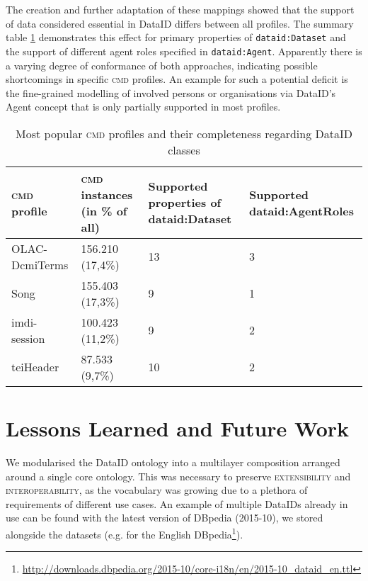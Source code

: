 \documentclass[runningheads,a4paper]{llncs}
\newcommand{\extensibility}{{\scshape extensibility}\xspace}
\newcommand{\interoperability}{{\scshape interoperability}\xspace}
\newcommand{\cmd}{{\scshape cmd}\xspace}
\newcommand{\prop}[1]{{{\texttt{#1}}}}
\newcommand\footnoteurl[1]{\footnote{\scriptsize\url{#1}}}
\begin{document}
The creation and further adaptation of these mappings showed that the support of data considered essential in DataID differs between all profiles. The summary table \ref{tab:cmdi_profiles} demonstrates this effect for primary properties of \prop{dataid:Dataset} and the support of different agent roles specified in \prop{dataid:Agent}. Apparently there is a varying degree of conformance of both approaches, indicating possible shortcomings in specific \cmd profiles. An example for such a potential deficit is the fine-grained modelling of involved persons or organisations via DataID's Agent concept that is only partially supported in most profiles.

\begin{table}[t]
    \centering
    \begin{tabular}{l|p{3cm}|p{3cm}|p{3cm}}
        \hline
        \cmd profile & \cmd instances (in \% of all) & Supported properties of dataid:Dataset & Supported dataid:AgentRoles \\
        \hline
        OLAC-DcmiTerms & 156.210 (17,4\%) & 13 & 3 \\
        Song & 155.403 (17,3\%)& 9 & 1 \\
        imdi-session & 100.423 (11,2\%) & 9 & 2 \\
        teiHeader & 87.533 (9,7\%)& 10 & 2 \\
    \end{tabular}
    \caption{Most popular \cmd profiles and their completeness regarding DataID classes}
    \vspace{-2.5em}
    \label{tab:cmdi_profiles}
\end{table}


\section{Lessons Learned and Future Work}
\label{lessons}

We modularised the DataID ontology into a multilayer composition arranged around a single core ontology. This was necessary to preserve \extensibility and \interoperability, as the vocabulary was growing due to a plethora of requirements of different use cases. An example of multiple DataIDs already in use can be found with the latest version of DBpedia (2015-10), we stored alongside the datasets (e.g. for the English DBpedia\footnoteurl{http://downloads.dbpedia.org/2015-10/core-i18n/en/2015-10_dataid_en.ttl}).
\end{document}
